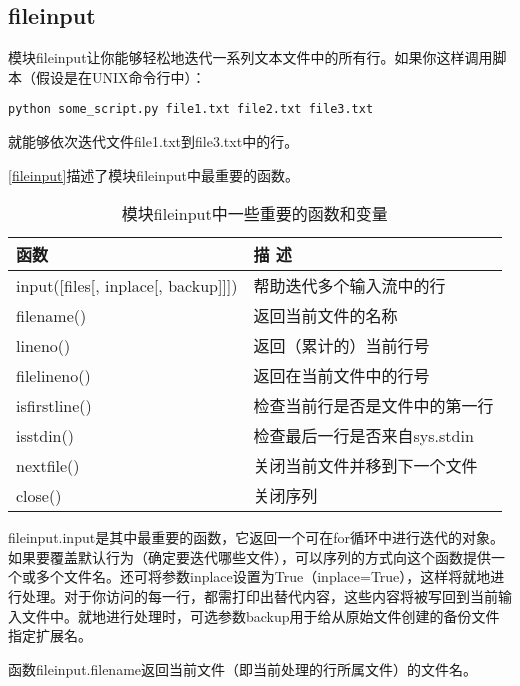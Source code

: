 \subsection{fileinput}
模块fileinput让你能够轻松地迭代一系列文本文件中的所有行。如果你这样调用脚本（假设是在UNIX命令行中）：

\verb|python some_script.py file1.txt file2.txt file3.txt|

就能够依次迭代文件file1.txt到file3.txt中的行。

\autoref{fileinput}描述了模块fileinput中最重要的函数。

\begin{table}
    \centering
    \caption{模块fileinput中一些重要的函数和变量}
    \label{fileinput}
    \begin{tabular}{ll}
        \hline
        函数                                  & 描 述                 \\
        \hline
        input([files[, inplace[, backup]]]) & 帮助迭代多个输入流中的行        \\
        filename()                          & 返回当前文件的名称           \\
        lineno()                            & 返回（累计的）当前行号         \\
        filelineno()                        & 返回在当前文件中的行号         \\
        isfirstline()                       & 检查当前行是否是文件中的第一行     \\
        isstdin()                           & 检查最后一行是否来自sys.stdin \\
        nextfile()                          & 关闭当前文件并移到下一个文件      \\
        close()&关闭序列                                               \\
        \hline
    \end{tabular}
\end{table}

fileinput.input是其中最重要的函数，它返回一个可在for循环中进行迭代的对象。如果要覆盖默认行为（确定要迭代哪些文件），可以序列的方式向这个函数提供一个或多个文件名。还可将参数inplace设置为True（inplace=True），这样将就地进行处理。对于你访问的每一行，都需打印出替代内容，这些内容将被写回到当前输入文件中。就地进行处理时，可选参数backup用于给从原始文件创建的备份文件指定扩展名。

函数fileinput.filename返回当前文件（即当前处理的行所属文件）的文件名。

